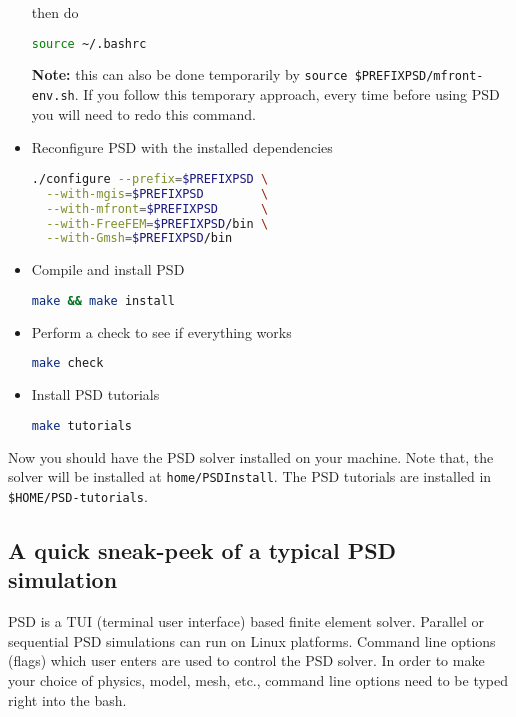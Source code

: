 \begin{itemize}
  then do

\begin{lstlisting}[language=bash]
source ~/.bashrc
\end{lstlisting}

  \textbf{Note:} this can also be done temporarily by
  \lstinline!source $PREFIXPSD/mfront-env.sh!. If you follow this
  temporary approach, every time before using PSD you will need to redo
  this command.
\item
  Reconfigure PSD with the installed dependencies

\begin{lstlisting}[language=bash]
./configure --prefix=$PREFIXPSD \
  --with-mgis=$PREFIXPSD        \
  --with-mfront=$PREFIXPSD      \
  --with-FreeFEM=$PREFIXPSD/bin \
  --with-Gmsh=$PREFIXPSD/bin
\end{lstlisting}
\item
  Compile and install PSD

\begin{lstlisting}[language=bash]
make && make install
\end{lstlisting}
\item
  Perform a check to see if everything works

\begin{lstlisting}[language=bash]
make check
\end{lstlisting}
\item
  Install PSD tutorials

\begin{lstlisting}[language=bash]
make tutorials
\end{lstlisting}
\end{itemize}

Now you should have the PSD solver installed on your machine. Note that,
the solver will be installed at \lstinline!home/PSDInstall!. The PSD
tutorials are installed in \lstinline!$HOME/PSD-tutorials!.

\subsection{A quick sneak-peek of a typical PSD simulation}

PSD is a TUI (terminal user interface) based finite element solver.
Parallel or sequential PSD simulations can run on Linux platforms.
Command line options (flags) which user enters are used to control the
PSD solver. In order to make your choice of physics, model, mesh, etc.,
command line options need to be typed right into the bash.


